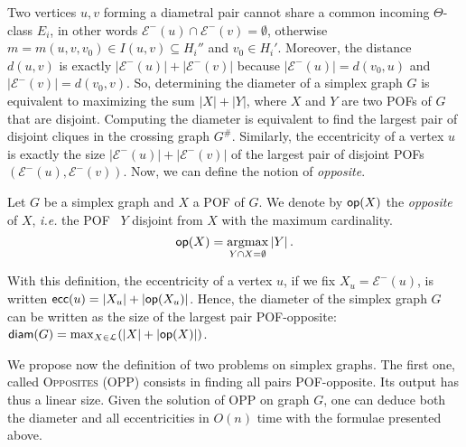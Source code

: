 \documentclass[a4paper,UKenglish,numberwithinsect,cleveref, autoref]{lipics-v2021}
\DeclareMathOperator*{\argmax}{argmax}
\newcommand{\card}[1]{\left| #1 \right|}
\newcommand{\diam}{\mbox{\textsf{diam}}}
\newcommand{\ecc}{\mbox{\textsf{ecc}}}
\newcommand{\opp}{\mbox{\textsf{op}}}
\begin{document}


Two vertices $u,v$ forming a diametral pair cannot share a common incoming $\Theta$-class $E_i$, in other words $\mathcal{E}^-(u) \cap \mathcal{E}^-(v) = \emptyset$, otherwise $m = m(u,v,v_0) \in I(u,v) \subseteq H_i''$ and $v_0 \in H_i'$. Moreover, the distance $d(u,v)$ is exactly $\card{\mathcal{E}^-(u)} + \card{\mathcal{E}^-(v)}$ because $\card{\mathcal{E}^-(u)} = d(v_0,u)$ and $\card{\mathcal{E}^-(v)} = d(v_0,v)$. So, determining the diameter of a simplex graph $G$ is equivalent to maximizing the sum $\card{X} + \card{Y}$, where $X$ and $Y$ are two POFs of $G$ that are disjoint. Computing the diameter is equivalent to find the largest pair of disjoint cliques in the crossing graph $G^{\#}$. Similarly, the eccentricity of a vertex $u$ is exactly the size $\card{\mathcal{E}^-(u)} + \card{\mathcal{E}^-(v)}$ of the largest pair of disjoint POFs $(\mathcal{E}^-(u),\mathcal{E}^-(v))$.
Now, we can define the notion of \textit{opposite}.

\begin{definition}
Let $G$ be a simplex graph and $X$ a POF of $G$. We denote by $\opp(X)$ the \textit{opposite} of $X$, {\em i.e.} the POF~ $Y$ disjoint from $X$ with the maximum cardinality.
$$
\opp(X) = \argmax_{Y \cap X = \emptyset} \card{Y}.
$$
\label{def:opposite}
\end{definition}

With this definition, the eccentricity of a vertex $u$, if we fix $X_u = \mathcal{E}^-(u)$, is written $\ecc(u) = \card{X_u} + \card{\opp(X_u)}$. Hence, the diameter of the simplex graph $G$ can be written as the size of the largest pair POF-opposite: $\diam(G) = \max_{X\in \mathcal{L}}( \card{X} + \card{\opp(X)})$.

We propose now the definition of two problems on simplex graphs. The first one, called \textsc{Opposites} (OPP) consists in finding all pairs POF-opposite. Its output has thus a linear size. Given the solution of OPP on graph $G$, one can deduce both the diameter and all eccentricities in $O(n)$ time with the formulae presented above.
\end{document}
